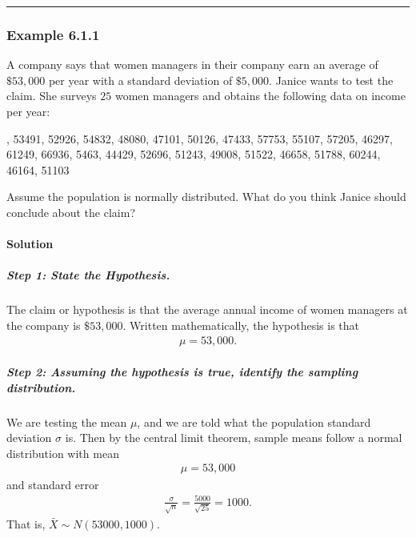 \documentclass[letterpaper,10pt,english]{jupyterBook}
\begin{document}
\bigskip\hrule\bigskip



\subsubsection{Example 6.1.1}
\label{\detokenize{Ch6 An Introduction to Hypothesis Testing/6.1 An Introduction to Hypothesis Testing:example-6-1-1}}
\sphinxAtStartPar
A company says that women managers in their company earn an average of \(\$53{,}000\) per year with a standard deviation of \(\$5{,}000\). Janice wants to test the claim. She surveys \(25\) women managers and obtains the following data on income per year:

, 53491, 52926, 54832, 48080, 47101, 50126, 47433, 57753, 55107, 57205, 46297, 61249, 66936, 5463, 44429, 52696, 51243, 49008, 51522, 46658, 51788, 60244, 46164, 51103

\sphinxAtStartPar
Assume the population is normally distributed. What do you think Janice should conclude about the claim?


\paragraph{Solution}
\label{\detokenize{Ch6 An Introduction to Hypothesis Testing/6.1 An Introduction to Hypothesis Testing:solution}}

\subparagraph{Step 1: State the Hypothesis.}
\label{\detokenize{Ch6 An Introduction to Hypothesis Testing/6.1 An Introduction to Hypothesis Testing:step-1-state-the-hypothesis}}
\sphinxAtStartPar
The claim or hypothesis is that the average annual income of women managers at the company is \(\$53,000\). Written mathematically, the hypothesis is that
\begin{equation*}
\begin{split} \mu = 53{,}000. \end{split}
\end{equation*}

\subparagraph{Step 2: Assuming the hypothesis is true, identify the sampling distribution.}
\label{\detokenize{Ch6 An Introduction to Hypothesis Testing/6.1 An Introduction to Hypothesis Testing:step-2-assuming-the-hypothesis-is-true-identify-the-sampling-distribution}}
\sphinxAtStartPar
We are testing the mean \(\mu\), and we are told what the population standard deviation \(\sigma\) is. Then by the central limit theorem, sample means follow a  normal distribution with mean
\begin{equation*}
\begin{split} \mu = 53{,}000 \end{split}
\end{equation*}
\sphinxAtStartPar
and standard error
\begin{equation*}
\begin{split} \frac{\sigma}{\sqrt{n}} = \frac{5000}{\sqrt{25}} = 1000. \end{split}
\end{equation*}
\sphinxAtStartPar
That is, \(\bar{X} \sim N(53000, 1000)\).
\end{document}
